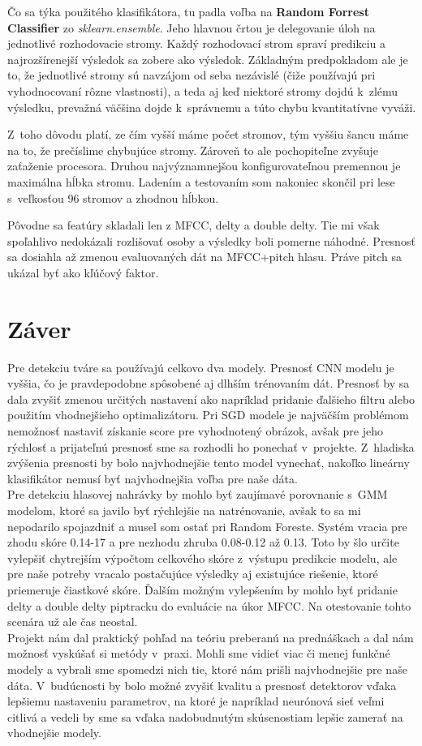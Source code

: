 \documentclass[11pt, a4paper]{article}
\begin{document}
			Čo sa týka použitého klasifikátora, tu padla voľba na \textbf{Random Forrest Classifier} zo \emph{sklearn.ensemble}. Jeho hlavnou črtou je delegovanie úloh na jednotlivé rozhodovacie stromy. Každý rozhodovací strom spraví predikciu a najrozšírenejší výsledok sa zobere ako výsledok. Základným predpokladom ale je to, že jednotlivé stromy sú navzájom od seba nezávislé (čiže používajú pri vyhodnocovaní rôzne vlastnosti), a teda aj keď niektoré stromy dojdú k~zlému výsledku, prevažná väčšina dojde k~správnemu a túto chybu kvantitatívne vyváži.
			
			Z~toho dôvodu platí, ze čím vyšší máme počet stromov, tým vyššiu šancu máme na to, že prečíslime chybujúce stromy. Zároveň to ale pochopiteľne zvyšuje zaťaženie procesora. Druhou najvýznamnejšou konfigurovateľnou premennou je maximálna hĺbka stromu.
			Ladením a testovaním som nakoniec skončil pri lese s~veľkosťou 96 stromov a zhodnou hĺbkou.

			Pôvodne sa featúry skladali len z MFCC, delty a double delty. Tie mi však spoľahlivo nedokázali rozlišovať osoby a výsledky boli pomerne náhodné. Presnosť sa dosiahla až zmenou evaluovaných dát na MFCC+pitch hlasu. Práve pitch sa ukázal byť ako kľúčový faktor.

\section{Záver}
	Pre detekciu tváre sa používajú celkovo dva modely. Presnosť CNN modelu je vyššia, čo je pravdepodobne spôsobené aj dlhším trénovaním dát. Presnosť by sa dala zvyšiť zmenou určitých nastavení ako napríklad pridanie ďalšieho filtru alebo použitím vhodnejšieho optimalizátoru. Pri SGD modele je najväčším problémom nemožnosť nastaviť získanie score pre vyhodnotený obrázok, avšak pre jeho rýchlosť a prijateľnú presnosť sme sa rozhodli ho ponechať v~projekte. Z~hladiska zvýšenia presnosti by bolo najvhodnejšie tento model vynechať, nakoľko lineárny klasifikátor nemusí byť najvhodnejšia voľba pre naše dáta. 
\\

	Pre detekciu hlasovej nahrávky by mohlo byť zaujímavé porovnanie s~GMM modelom, ktoré sa javilo byť rýchlejšie na natrénovanie, avšak to sa mi nepodarilo spojazdniť a musel som ostať pri Random Foreste. Systém vracia pre zhodu skóre 0.14-17 a pre nezhodu zhruba 0.08-0.12 až 0.13. Toto by šlo určite vylepšiť chytrejším výpočtom celkového skóre z~výstupu predikcie modelu, ale pre naše potreby vracalo postačujúce výsledky aj existujúce riešenie, ktoré priemeruje čiastkové skóre.
	Ďalším možným vylepšením by mohlo byť pridanie delty a double delty piptracku do evaluácie na úkor MFCC. Na otestovanie tohto scenára už ale čas neostal.
\\
	
	Projekt nám dal praktický pohľad na teóriu preberanú na prednáškach a dal nám možnosť vyskúšať si metódy v~praxi. Mohli sme vidieť viac či menej funkčné modely a vybrali sme spomedzi nich tie, ktoré nám prišli najvhodnejšie pre naše dáta. V~budúcnosti by bolo možné zvyšiť kvalitu a presnosť detektorov vďaka lepšiemu nastaveniu parametrov, na ktoré je napríklad neurónová sieť veľmi citlivá a vedeli by sme sa vďaka nadobudnutým skúsenostiam lepšie zamerať na vhodnejšie modely.
\end{document}
